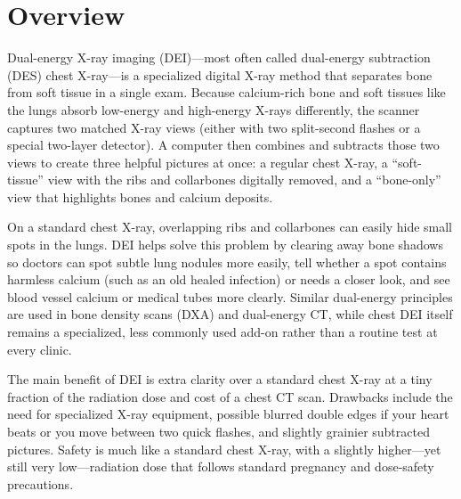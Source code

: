 \label{ch:infographic-dei}

\section{Overview}

Dual-energy X-ray imaging (DEI)---most often called dual-energy subtraction (DES) chest X-ray---is a specialized digital X-ray method that separates bone from soft tissue in a single exam. Because calcium-rich bone and soft tissues like the lungs absorb low-energy and high-energy X-rays differently, the scanner captures two matched X-ray views (either with two split-second flashes or a special two-layer detector). A computer then combines and subtracts those two views to create three helpful pictures at once: a regular chest X-ray, a ``soft-tissue'' view with the ribs and collarbones digitally removed, and a ``bone-only'' view that highlights bones and calcium deposits.

On a standard chest X-ray, overlapping ribs and collarbones can easily hide small spots in the lungs. DEI helps solve this problem by clearing away bone shadows so doctors can spot subtle lung nodules more easily, tell whether a spot contains harmless calcium (such as an old healed infection) or needs a closer look, and see blood vessel calcium or medical tubes more clearly. Similar dual-energy principles are used in bone density scans (DXA) and dual-energy CT, while chest DEI itself remains a specialized, less commonly used add-on rather than a routine test at every clinic.

The main benefit of DEI is extra clarity over a standard chest X-ray at a tiny fraction of the radiation dose and cost of a chest CT scan. Drawbacks include the need for specialized X-ray equipment, possible blurred double edges if your heart beats or you move between two quick flashes, and slightly grainier subtracted pictures. Safety is much like a standard chest X-ray, with a slightly higher---yet still very low---radiation dose that follows standard pregnancy and dose-safety precautions.

